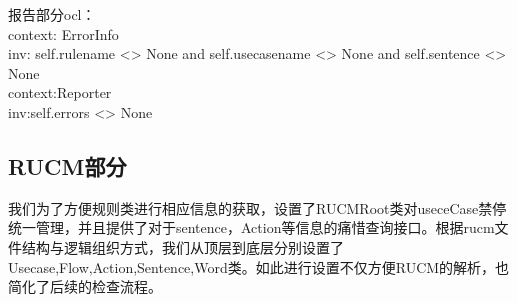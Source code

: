 	报告部分ocl：\\
	context: ErrorInfo\\
	inv: self.rulename <> None and self.usecasename <> None and self.sentence <> None\\
	context:Reporter\\
	inv:self.errors <> None\\
	
    \subsection{RUCM部分}
  	我们为了方便规则类进行相应信息的获取，设置了RUCMRoot类对useceCase禁停统一管理，并且提供了对于sentence，Action等信息的痛惜查询接口。根据rucm文件结构与逻辑组织方式，我们从顶层到底层分别设置了Usecase,Flow,Action,Sentence,Word类。如此进行设置不仅方便RUCM的解析，也简化了后续的检查流程。
